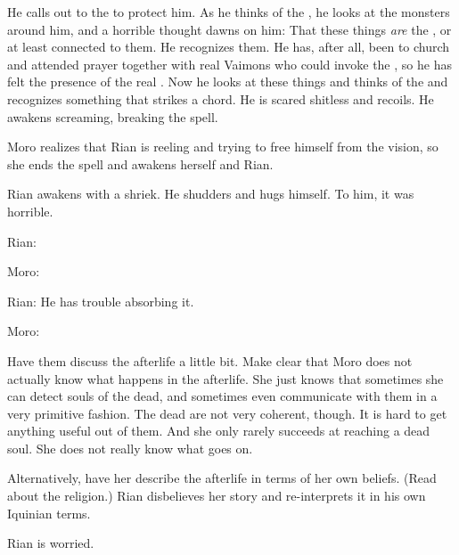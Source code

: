 He calls out to the \sephiroth to protect him.
As he thinks of the \sephiroth, he looks at the monsters around him, and a horrible thought dawns on him:
That these things \emph{are} the \sephiroth, or at least connected to them.
He recognizes them.
He has, after all, been to church and attended prayer together with real Vaimons who could invoke the \sephiroth, so he has felt the presence of the real \sephiroth.
Now he looks at these things and thinks of the \sephiroth and recognizes something that strikes a chord. 
He is scared shitless and recoils.
He awakens screaming, breaking the spell. 





\begin{comment}
  \section{The spell ends}
\end{comment}
\new
Moro realizes that Rian is reeling and trying to free himself from the vision, so she ends the spell and awakens herself and Rian. 

Rian awakens with a shriek. 
He shudders and hugs himself. 
To him, it was horrible. 

Rian:

Moro:

Rian:
He has trouble absorbing it. 

Moro:

Have them discuss the afterlife a little bit.
Make clear that Moro does not actually know what happens in the afterlife.
She just knows that sometimes she can detect souls of the dead, and sometimes even communicate with them in a very primitive fashion.
The dead are not very coherent, though.
It is hard to get anything useful out of them.
And she only rarely succeeds at reaching a dead soul.
She does not really know what goes on. 

Alternatively, have her describe the afterlife in terms of her own \rethyax beliefs. 
(Read about the \Ortaican religion.)
Rian disbelieves her story and re-interprets it in his own Iquinian terms. 

Rian is worried. 

